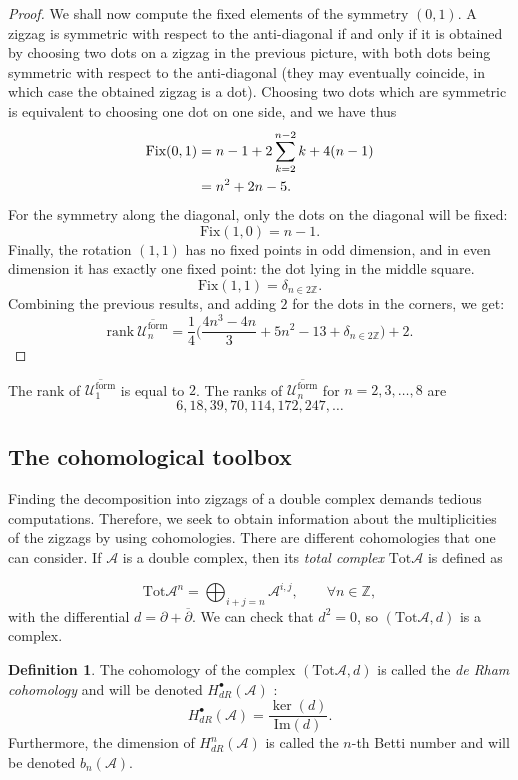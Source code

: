 \documentclass[leqno]{article}
\theoremstyle{definition}
\newtheorem{Definition}[equation]{Definition}
\numberwithin{equation}{section}
\begin{document}
\begin{proof}
We shall now compute the fixed elements of the symmetry $(0, 1)$. A zigzag is symmetric with respect to the anti-diagonal if and only if it is obtained by choosing two dots on a zigzag in the previous picture, with both dots being symmetric with respect to the anti-diagonal (they may eventually coincide, in which case the obtained zigzag is a dot). Choosing two dots which are symmetric is equivalent to choosing one dot on one side, and we have thus
\[
\aligned
\text{Fix} (0, 1)
&=
n-1
+
2\sum_{k=2}^{n-2} k
+
4(n-1) \\
&=
n^2+2n-5.
\endaligned
\]
For the symmetry along the diagonal, only the dots on the diagonal will be fixed:
\[
\text{Fix} (1, 0)
=
n-1.
\]
Finally, the rotation $(1, 1)$ has no fixed points in odd dimension, and in even dimension it has exactly one fixed point: the dot lying in the middle square.
\[
\text{Fix} (1, 1)
=
\delta_{n \in 2\mathbb{Z}}.
\]
Combining the previous results, and adding $2$ for the dots in the corners, we get:
\[
\text{rank} \ \overline{\mathcal{U}^{\text{form}}_n}
=
\frac{1}{4}
\Big(\frac{4n^3 - 4n}{3}
+5n^2
- 13
+ \delta_{n \in 2\mathbb{Z}}
\Big)
+
2.
\]
\end{proof}
The rank of $\overline{\mathcal{U}^{\text{form}}_1}$ is equal to $2$. The ranks of $\overline{\mathcal{U}^{\text{form}}_n}$ for $n= 2, 3, \dots, 8$ are
\[
6, 18, 39, 70, 114, 172, 247, \dots
\]

\subsection{The cohomological toolbox}

Finding the decomposition into zigzags of a double complex demands tedious computations. 
Therefore, we seek to obtain information about the multiplicities of the zigzags by using cohomologies. 
There are different cohomologies that one can consider. If $\mathcal{A}$ is a double complex, then its {\sl total complex} $\text{Tot} \mathcal{A}$ is defined as

\[
\text{Tot} \mathcal{A}^n
=
\bigoplus_{i + j = n}
\mathcal{A}^{i, j},
\quad \quad
\forall n \in \mathbb{Z},
\]
with the differential $d = \partial + \overline{\partial}$. We can check that $d^2 = 0$, so 
$(\text{Tot}\mathcal{A}, d)$
is a complex.

\begin{Definition}
The cohomology of the complex $(\text{Tot}\mathcal{A}, d)$ is called the {\sl de Rham cohomology} and will be denoted $H_{dR}^{\bullet}(\mathcal{A})$ :
\[
H_{dR}^{\bullet}(\mathcal{A})
=
\frac{\ker(d)}{\text{Im}(d)}.
\]
Furthermore, the dimension of $H_{dR}^n(\mathcal{A})$ is called the $n$-th Betti number and will be denoted $b_n(\mathcal{A})$.
\end{Definition}
\end{document}
